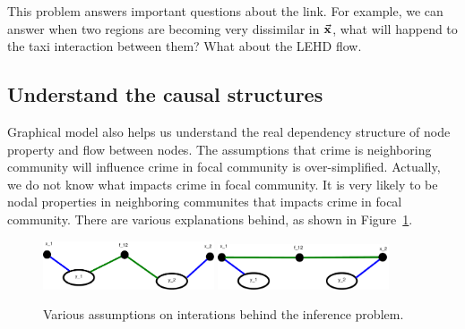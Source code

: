 This problem answers important questions about the link. For example, we can answer when two regions are becoming very dissimilar in $\vec{\mathbf{x}}$, what will happend to the taxi interaction between them? What about the LEHD flow.



\subsection{Understand the causal structures}


Graphical model also helps us understand the real dependency structure of node property and flow between nodes.
The assumptions that crime is neighboring community will influence crime in focal community is  over-simplified. Actually, we do not know what impacts crime in focal community. It is very likely to be nodal properties in neighboring communites that impacts crime in focal community. There are various explanations behind, as shown in Figure~\ref{fig:crf-assump}.



\begin{figure}[h]
\centering
\includegraphics[width=0.45\textwidth]{fig/CRF-base.pdf}
\includegraphics[width=0.45\textwidth]{fig/CRF-impr.pdf}
\caption{Various assumptions on interations behind the inference problem.}
\label{fig:crf-assump}
\end{figure}


